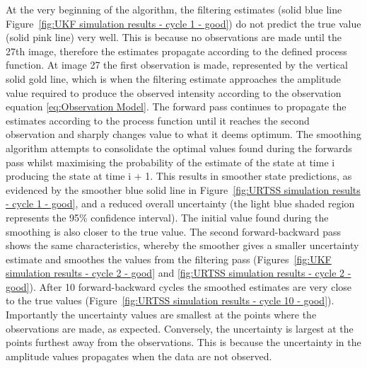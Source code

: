At the very beginning of the algorithm, the filtering estimates (solid blue line Figure~\ref{fig:UKF simulation results - cycle 1 - good}) do not predict the true value (solid pink line) very well.
This is because no observations are made until the 27th image, therefore the estimates propagate according to the defined process function.
At image 27 the first observation is made, represented by the vertical solid gold line, which is when the filtering estimate approaches the amplitude value required to produce the observed intensity according to the observation equation \ref{eq:Observation Model}.
The forward pass continues to propagate the estimates according to the process function until it reaches the second observation and sharply changes value to what it deems optimum.
The smoothing algorithm attempts to consolidate the optimal values found during the forwards pass whilst maximising the probability of the estimate of the state at time i producing the state at time i + 1.
This results in smoother state predictions, as evidenced by the smoother blue solid line in Figure~\ref{fig:URTSS simulation results - cycle 1 - good}, and a reduced overall uncertainty (the light blue shaded region represents the 95\% confidence interval).
The initial value found during the smoothing is also closer to the true value.
The second forward-backward pass shows the same characteristics, whereby the smoother gives a smaller uncertainty estimate and smoothes the values from the filtering pass (Figures~\ref{fig:UKF simulation results - cycle 2 - good} and \ref{fig:URTSS simulation results - cycle 2 - good}).
After 10 forward-backward cycles the smoothed estimates are very close to the true values (Figure~\ref{fig:URTSS simulation results - cycle 10 - good}).
Importantly the uncertainty values are smallest at the points where the observations are made, as expected.
Conversely, the uncertainty is largest at the points furthest away from the observations.
This is because the uncertainty in the amplitude values propagates when the data are not observed.


